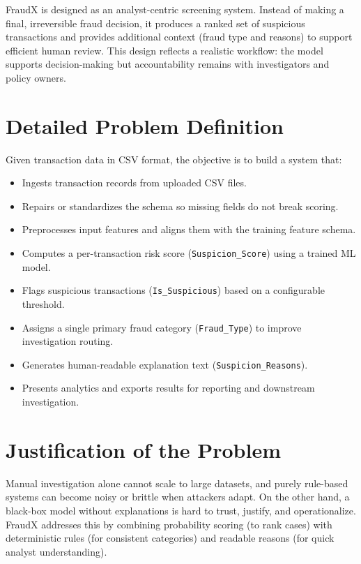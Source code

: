 \documentclass[12pt,a4paper]{report}
\begin{document}
FraudX is designed as an analyst-centric screening system. Instead of making a final, irreversible fraud decision, it produces a ranked set of suspicious transactions and provides additional context (fraud type and reasons) to support efficient human review. This design reflects a realistic workflow: the model supports decision-making but accountability remains with investigators and policy owners.

\section{Detailed Problem Definition}
Given transaction data in CSV format, the objective is to build a system that:
\begin{itemize}
  \item Ingests transaction records from uploaded CSV files.
  \item Repairs or standardizes the schema so missing fields do not break scoring.
  \item Preprocesses input features and aligns them with the training feature schema.
  \item Computes a per-transaction risk score (\texttt{Suspicion\_Score}) using a trained ML model.
  \item Flags suspicious transactions (\texttt{Is\_Suspicious}) based on a configurable threshold.
  \item Assigns a single primary fraud category (\texttt{Fraud\_Type}) to improve investigation routing.
  \item Generates human-readable explanation text (\texttt{Suspicion\_Reasons}).
  \item Presents analytics and exports results for reporting and downstream investigation.
\end{itemize}

\section{Justification of the Problem}
Manual investigation alone cannot scale to large datasets, and purely rule-based systems can become noisy or brittle when attackers adapt. On the other hand, a black-box model without explanations is hard to trust, justify, and operationalize. FraudX addresses this by combining probability scoring (to rank cases) with deterministic rules (for consistent categories) and readable reasons (for quick analyst understanding).
\end{document}
